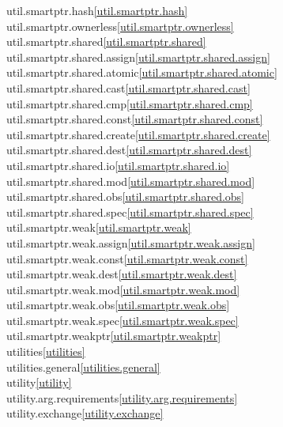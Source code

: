 \begin{multicols}{2}
util.smartptr.hash\quad\ref{util.smartptr.hash}\\
util.smartptr.ownerless\quad\ref{util.smartptr.ownerless}\\
util.smartptr.shared\quad\ref{util.smartptr.shared}\\
util.smartptr.shared.assign\quad\ref{util.smartptr.shared.assign}\\
util.smartptr.shared.atomic\quad\ref{util.smartptr.shared.atomic}\\
util.smartptr.shared.cast\quad\ref{util.smartptr.shared.cast}\\
util.smartptr.shared.cmp\quad\ref{util.smartptr.shared.cmp}\\
util.smartptr.shared.const\quad\ref{util.smartptr.shared.const}\\
util.smartptr.shared.create\quad\ref{util.smartptr.shared.create}\\
util.smartptr.shared.dest\quad\ref{util.smartptr.shared.dest}\\
util.smartptr.shared.io\quad\ref{util.smartptr.shared.io}\\
util.smartptr.shared.mod\quad\ref{util.smartptr.shared.mod}\\
util.smartptr.shared.obs\quad\ref{util.smartptr.shared.obs}\\
util.smartptr.shared.spec\quad\ref{util.smartptr.shared.spec}\\
util.smartptr.weak\quad\ref{util.smartptr.weak}\\
util.smartptr.weak.assign\quad\ref{util.smartptr.weak.assign}\\
util.smartptr.weak.const\quad\ref{util.smartptr.weak.const}\\
util.smartptr.weak.dest\quad\ref{util.smartptr.weak.dest}\\
util.smartptr.weak.mod\quad\ref{util.smartptr.weak.mod}\\
util.smartptr.weak.obs\quad\ref{util.smartptr.weak.obs}\\
util.smartptr.weak.spec\quad\ref{util.smartptr.weak.spec}\\
util.smartptr.weakptr\quad\ref{util.smartptr.weakptr}\\
utilities\quad\ref{utilities}\\
utilities.general\quad\ref{utilities.general}\\
utility\quad\ref{utility}\\
utility.arg.requirements\quad\ref{utility.arg.requirements}\\
utility.exchange\quad\ref{utility.exchange}\\

\end{multicols}
